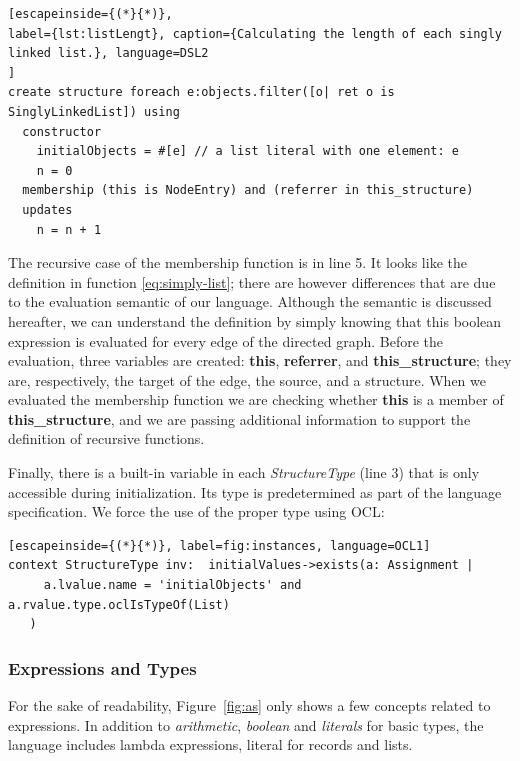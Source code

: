 \begin{lstlisting}[escapeinside={(*}{*)}, 
label={lst:listLengt}, caption={Calculating the length of each singly linked list.}, language=DSL2
]
create structure foreach e:objects.filter([o| ret o is SinglyLinkedList]) using
  constructor
    initialObjects = #[e] // a list literal with one element: e
    n = 0
  membership (this is NodeEntry) and (referrer in this_structure)
  updates 
    n = n + 1
\end{lstlisting}

The recursive case of the membership function is in line 5.
It looks like the definition in function \ref{eq:simply-list}; there are however differences that are due to the evaluation semantic of our language.
Although the semantic is discussed hereafter, we can understand the definition by simply knowing that this boolean expression is evaluated for every edge of the directed graph.
Before the evaluation, three variables are created: \textbf{this}, \textbf{referrer}, and \textbf{this\_structure}; they are, respectively, the target of the edge, the source, and a structure.
When we evaluated the membership function we are checking whether \textbf{this} is a member of \textbf{this\_structure}, and we are passing additional information to support the definition of recursive functions.

Finally, there is a built-in variable in each \textit{StructureType} (line 3) that is only accessible during initialization.
Its type is predetermined as part of the language specification.
We force the use of the proper type using OCL:

\begin{lstlisting}[escapeinside={(*}{*)}, label=fig:instances, language=OCL1]
context StructureType inv:  initialValues->exists(a: Assignment | 
     a.lvalue.name = 'initialObjects' and a.rvalue.type.oclIsTypeOf(List)
   ) 
\end{lstlisting}


\subsubsection*{Expressions and Types}


For the sake of readability, Figure~\ref{fig:as} only shows a few concepts related to expressions.
In addition to \textit{arithmetic}, \textit{boolean} and \textit{literals} for basic types, the language includes lambda expressions, literal for records and lists.

